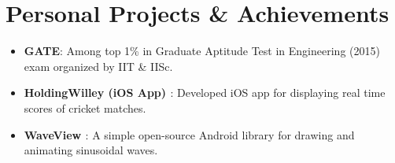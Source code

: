 \documentclass[letterpaper,11pt]{article}
\newcommand{\resumeItem}[2]{
	\item\normalsize{
		\textbf{#1}{: #2}
	}
}
\newcommand{\resumeSubItem}[2]{\resumeItem{#1}{#2}\vspace{-4pt}}
\newcommand{\resumeSubHeadingListStart}{\begin{itemize}[leftmargin=*]}
\newcommand{\resumeSubHeadingListEnd}{\end{itemize}}
\begin{document}
	\section{Personal Projects \& Achievements}
	\resumeSubHeadingListStart
	\resumeSubItem{GATE}
	{Among top 1\% in Graduate Aptitude Test in Engineering (2015) exam organized by IIT \& IISc.}%
	\resumeSubItem{HoldingWilley (iOS App) \href{https://apps.apple.com/app/id1229976116}{\faApple}}
	{Developed iOS app for displaying real time scores of cricket matches.}
	\resumeSubItem{WaveView \href{https://github.com/narayanacharya6/WaveView}{\faGithub}}
	{A simple open-source Android library for drawing and animating sinusoidal waves.}
	\resumeSubHeadingListEnd
	
\end{document}
